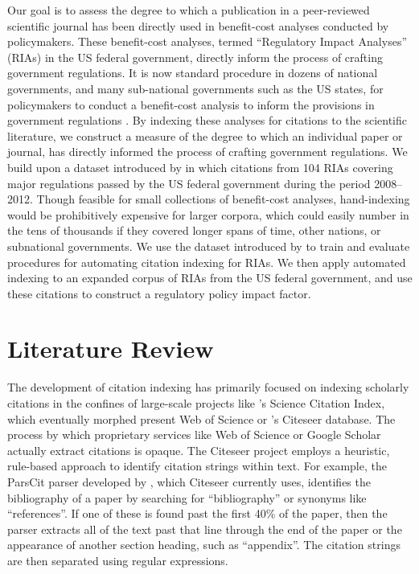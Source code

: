 \documentclass[12pt]{article}
\begin{document}
Our goal is to assess the degree to which a publication in a peer-reviewed scientific journal has been directly used in benefit-cost analyses conducted by policymakers. These benefit-cost analyses, termed ``Regulatory Impact Analyses'' (RIAs) in the US federal government, directly inform the process of crafting government regulations. It is now standard procedure in dozens of national governments, and many sub-national governments such as the US states, for policymakers to conduct a benefit-cost analysis to inform the provisions in government regulations \cite{hahn2007}. By indexing these analyses for citations to the scientific literature, we construct a measure of the degree to which an individual paper or journal, has directly informed the process of crafting government regulations. We build upon a dataset introduced by \cite{desmarais2014} in which citations from 104 RIAs covering major regulations passed by the US federal government during the period 2008--2012. Though feasible for small collections of benefit-cost analyses, hand-indexing would be prohibitively expensive for larger corpora, which could easily number in the tens of thousands if they covered longer spans of time, other nations, or subnational governments. We use the dataset introduced by \cite{desmarais2014} to train and evaluate procedures for automating citation indexing for RIAs. We then apply automated indexing to an expanded corpus of RIAs from the US federal government, and use these citations to construct a regulatory policy impact factor.


\section{Literature Review}
The development of citation indexing has primarily focused on indexing scholarly citations in the confines of large-scale projects like 's Science Citation Index, which eventually morphed present Web of Science or 's Citeseer database. The process by which proprietary services like Web of Science or Google Scholar actually extract citations is opaque. The Citeseer project employs a heuristic, rule-based approach to identify citation strings within text. For example, the ParsCit parser developed by , which Citeseer currently uses, identifies the bibliography of a paper by searching for ``bibliography'' or synonyms like ``references''. If one of these is found past the first 40\% of the paper, then the parser extracts all of the text past that line through the end of the paper or the appearance of another section heading, such as ``appendix''. The citation strings are then separated using regular expressions. 
\end{document}

